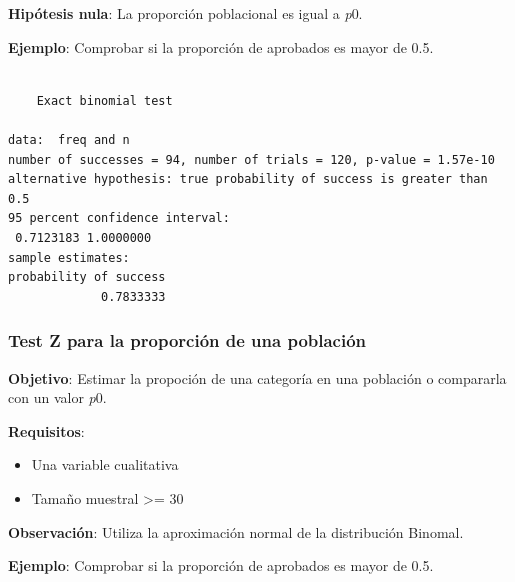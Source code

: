 \documentclass[
  spanish,
  a4paper,
]{scrreport}
\newenvironment{Shaded}{\begin{snugshade}}{\end{snugshade}}
\newcommand{\AttributeTok}[1]{\textcolor[rgb]{0.40,0.45,0.13}{#1}}
\newcommand{\FloatTok}[1]{\textcolor[rgb]{0.68,0.00,0.00}{#1}}
\newcommand{\FunctionTok}[1]{\textcolor[rgb]{0.28,0.35,0.67}{#1}}
\newcommand{\NormalTok}[1]{\textcolor[rgb]{0.00,0.23,0.31}{#1}}
\newcommand{\OtherTok}[1]{\textcolor[rgb]{0.00,0.23,0.31}{#1}}
\newcommand{\SpecialCharTok}[1]{\textcolor[rgb]{0.37,0.37,0.37}{#1}}
\newcommand{\StringTok}[1]{\textcolor[rgb]{0.13,0.47,0.30}{#1}}
\providecommand{\tightlist}{%
  \setlength{\itemsep}{0pt}\setlength{\parskip}{0pt}}
\theoremstyle{definition}
\theoremstyle{definition}
\theoremstyle{remark}
\begin{document}
\textbf{Hipótesis nula}: La proporción poblacional es igual a \emph{p}0.

\textbf{Ejemplo}: Comprobar si la proporción de aprobados es mayor de
0.5.

\begin{Shaded}
\end{Shaded}

\begin{verbatim}

    Exact binomial test

data:  freq and n
number of successes = 94, number of trials = 120, p-value = 1.57e-10
alternative hypothesis: true probability of success is greater than 0.5
95 percent confidence interval:
 0.7123183 1.0000000
sample estimates:
probability of success 
             0.7833333 
\end{verbatim}

\subsubsection{Test Z para la proporción de una
población}\label{test-z-para-la-proporciuxf3n-de-una-poblaciuxf3n}

\textbf{Objetivo}: Estimar la propoción de una categoría en una
población o compararla con un valor \emph{p}0.

\textbf{Requisitos}:

\begin{itemize}
\tightlist
\item
  Una variable cualitativa
\item
  Tamaño muestral \textgreater= 30
\end{itemize}

\textbf{Observación}: Utiliza la aproximación normal de la distribución
Binomal.

\textbf{Ejemplo}: Comprobar si la proporción de aprobados es mayor de
0.5.

\begin{Shaded}
\end{Shaded}
\end{document}
